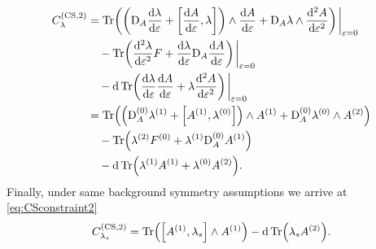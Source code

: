 \documentclass[]{jkpaper}
\theoremstyle{plain}
\theoremstyle{definition}
\newcommand{\eps}{\varepsilon}
\newcommand{\DD}[1]{\text{D}_A#1}
\begin{document}
\begin{equation}
    \begin{split}
        C_\lambda^{(\text{CS},2)} &=  \Tr( \left(\DD \dv{\lambda}{\eps} + \comm{\dv{A}{\eps}}{\lambda} \right) \wedge \dv{A}{\eps} + \DD \lambda \wedge \dv[2]{A}{\eps}) \eval_{\eps = 0}
        \\
        &\hspace{10pt} -  \Tr( \dv[2]{\lambda}{\eps} F +\dv{\lambda}{\eps} \DD \dv{A}{\eps}) \eval_{\eps = 0}
        \\
        &\hspace{10pt} -  \dd \Tr(\dv{\lambda}{\eps} \dv{A}{\eps} + \lambda \dv[2]{A}{\eps}) \eval_{\eps = 0}
        \\&=  \Tr( \left(\DD^{(0)} \lambda^{(1)} + \comm{A^{(1)}}{\lambda^{(0)}} \right) \wedge A^{(1)} + \DD^{(0)} \lambda^{(0)} \wedge A^{(2)})
        \\&\hspace{10pt} -  \Tr( \lambda^{(2)} F^{(0)}  + \lambda^{(1)} \DD^{(0)} A^{(1)})
        \\&\hspace{10pt} -  \dd \Tr(\lambda^{(1)} A^{(1)} + \lambda^{(0)} A^{(2)}).
    \end{split}
\end{equation}
Finally, under same background symmetry assumptions we arrive at \eqref{eq:CSconstraint2}
\begin{equation}
    C_{\lambda_s}^{(\text{CS},2)} =  \Tr( \comm{A^{(1)}}{\lambda_s} \wedge A^{(1)})
    -  \dd \Tr(\lambda_s A^{(2)}).
\end{equation}
\end{document}
